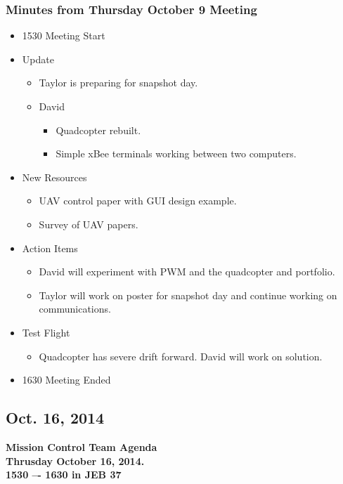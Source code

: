 \documentclass[pdftex,11pt]{article}
\begin{document}
\subsubsection[short]{Minutes from Thursday October 9 Meeting}
\begin{itemize}
	\item 1530 \indent Meeting Start
	\item Update
	\begin{itemize}
		\item  Taylor is preparing for snapshot day.
		\item David
		\begin{itemize}
			\item Quadcopter rebuilt.
			\item Simple xBee terminals working between two computers.
		\end{itemize}
	\end{itemize}
	\item New Resources
		\begin{itemize}
			\item UAV control paper with GUI design example.
			\item Survey of UAV papers.
		\end{itemize}
	\item Action Items
	\begin{itemize}
		\item David will experiment with PWM and the quadcopter and  portfolio.
		\item Taylor will work on poster for snapshot day and continue working on communications.
	\end{itemize}
	\item Test Flight
	\begin{itemize}
		\item  Quadcopter has severe drift forward. David will work on solution.
	\end{itemize}
	\item 1630 \indent Meeting Ended
\end{itemize}	



\subsection{Oct. 16, 2014}
{ \huge \bfseries Mission Control Team Agenda \\[0.4cm] }
{ \huge \bfseries Thrusday October 16, 2014.\\1530 –-  1630  in JEB 37\\[0.4cm] }
\vspace*{2.5mm}
\end{document}
